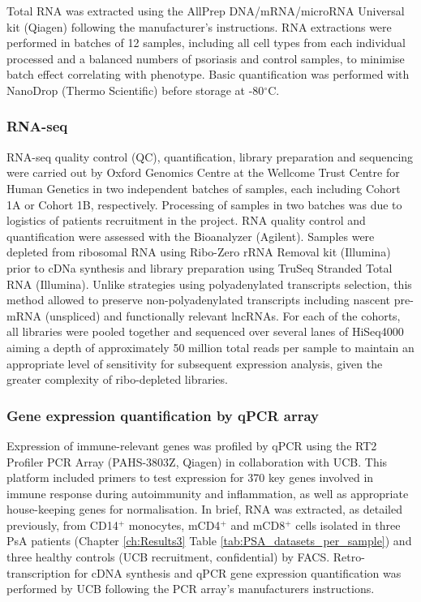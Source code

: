 Total RNA was extracted using the AllPrep DNA/mRNA/microRNA Universal kit (Qiagen) following the manufacturer's instructions. RNA extractions were performed in batches of 12 samples, including all cell types from each individual processed and a balanced numbers of psoriasis and control samples, to minimise batch effect correlating with phenotype. Basic quantification was performed with NanoDrop (Thermo Scientific) before storage at -80{$^\circ$}C.


\subsubsection{RNA-seq}
RNA-seq quality control (QC), quantification, library preparation and sequencing were carried out by Oxford Genomics Centre at the Wellcome Trust Centre for Human Genetics in two independent batches of samples, each including Cohort 1A or Cohort 1B, respectively. Processing of samples in two batches was due to logistics of patients recruitment in the project. RNA quality control and quantification were assessed with the Bioanalyzer (Agilent). Samples were depleted from ribosomal RNA using Ribo-Zero rRNA Removal kit (Illumina) prior to cDNa synthesis and library preparation using TruSeq Stranded Total RNA (Illumina). Unlike strategies using polyadenylated transcripts selection, this method allowed to preserve non-polyadenylated transcripts including nascent pre-mRNA (unspliced) and functionally relevant lncRNAs. For each of the cohorts, all libraries were pooled together and sequenced over several lanes of HiSeq4000 aiming a depth of approximately 50 million total reads per sample to maintain an appropriate level of sensitivity for subsequent expression analysis, given the greater complexity of ribo-depleted libraries.

\subsubsection{Gene expression quantification by qPCR array}
Expression of immune-relevant genes was profiled by qPCR using the RT2 Profiler PCR Array (PAHS-3803Z, Qiagen) in collaboration with UCB. This platform included primers to test expression for 370 key genes involved in immune response during autoimmunity and inflammation, as well as appropriate house-keeping genes for normalisation. In brief, RNA was extracted, as detailed previously, from CD14$^+$ monocytes, mCD4$^+$ and mCD8$^+$ cells isolated in three PsA patients (Chapter \ref{ch:Results3} Table \ref{tab:PSA_datasets_per_sample}) and three healthy controls (UCB recruitment, confidential) by FACS. Retro-transcription for cDNA synthesis and qPCR gene expression quantification was performed by UCB following the PCR array's manufacturers instructions.  

